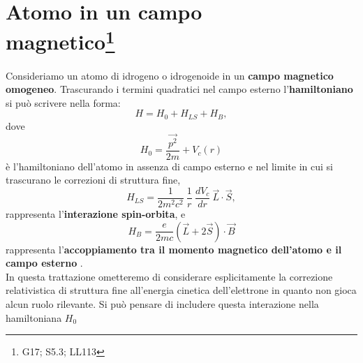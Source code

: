 \chapter[Atomo in un campo magnetico]{Atomo in un campo\\magnetico\footnote{G17; S5.3; LL113}}
Consideriamo un atomo di idrogeno o idrogenoide in un \textbf{campo magnetico omogeneo}.
Trascurando i termini quadratici nel campo esterno l'\textbf{hamiltoniano} si può scrivere nella forma:
\begin{equation} \label{eq:cap24_1}
H=H_0+H_{LS}+H_B ,
\end{equation}
dove
\begin{equation} \label{eq:cap24_2}
H_0=\frac{\vec{p^2}}{2m}+V_c(r) 
\end{equation}
è l'hamiltoniano dell'atomo in assenza di campo esterno e nel limite in cui si trascurano le correzioni di struttura fine,
\begin{equation} \label{eq:cap24_3}
H_{LS}=\frac{1}{2m^2c^2} \ \frac{1}{r} \ \frac{dV_c}{dr} \ \vec{L} \cdot \vec{S} ,
\end{equation}
rappresenta l'\textbf{interazione spin-orbita}, e
\begin{equation} \label{eq:cap24_4}
H_B=\frac{e}{2mc}\left( \vec{L}+2\vec{S} \right) \cdot \vec{B} 
\end{equation}
rappresenta l'\textbf{accoppiamento tra il momento magnetico dell'atomo e il campo esterno}
. \\
In questa trattazione ometteremo di considerare esplicitamente la correzione relativistica di struttura fine all'energia cinetica dell'elettrone in quanto non gioca alcun ruolo rilevante. Si può pensare di includere questa interazione nella hamiltoniana $H_0$

